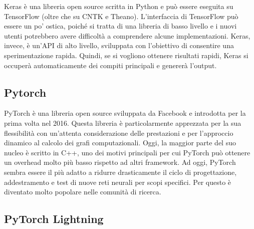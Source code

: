 Keras \cite{Framework_AnalyticsVidhya,Framework_VisoAI,Framework_Devopedia} è 
una libreria open source scritta in Python e può essere eseguita su 
TensorFlow (oltre che su CNTK e Theano). L'interfaccia di TensorFlow può essere un 
po' ostica, poiché si tratta di una libreria di basso livello e i nuovi utenti 
potrebbero avere difficoltà a comprendere alcune implementazioni.
Keras, invece, è un'API di alto livello, sviluppata con l'obiettivo di consentire 
una sperimentazione rapida. Quindi, se si vogliono ottenere risultati rapidi, 
Keras si occuperà automaticamente dei compiti principali e genererà l'output.

\aftergroup
\par

\subsection{Pytorch}
\begin{figure}  %
    \setlength{\fboxsep}{2pt} %
    \setlength{\fboxrule}{0pt} %
\end{figure}

PyTorch \cite{Framework_AnalyticsVidhya,Framework_VisoAI,Framework_Devopedia} è una libreria open source sviluppata da Facebook e introdotta per la 
prima volta nel 2016. Questa libreria è particolarmente apprezzata per la 
sua flessibilità con un'attenta considerazione delle prestazioni e per l'approccio 
dinamico al calcolo dei grafi computazionali. Oggi, la maggior parte del suo nucleo è scritto in C++, uno dei motivi principali 
per cui PyTorch può ottenere un overhead molto più basso rispetto ad 
altri framework. Ad oggi, PyTorch sembra essere il più adatto a ridurre 
drasticamente il ciclo di progettazione, addestramento e test di nuove reti 
neurali per scopi specifici. Per questo è diventato molto popolare nelle comunità 
di ricerca.

\subsection{PyTorch Lightning}

